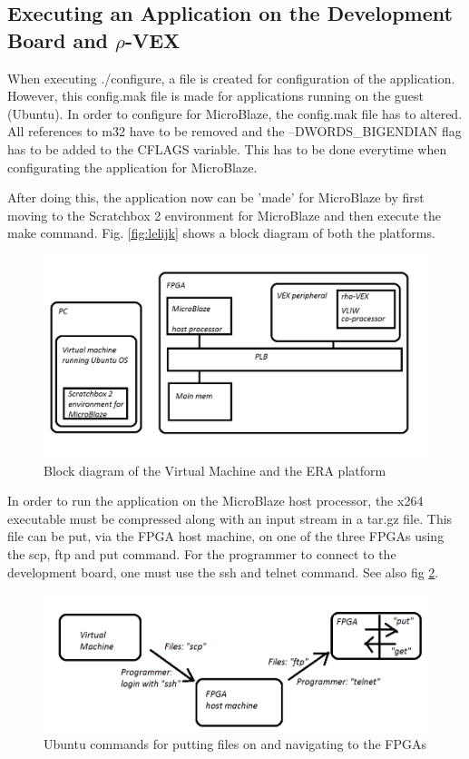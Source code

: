 \subsection{Executing an Application on the Development Board and $\rho$-VEX}

When executing ./configure, a file is created for configuration of the application. However, this config.mak file is made for applications running on the guest (Ubuntu). In order to configure for MicroBlaze, the config.mak file has to altered. All references to m32 have to be removed and the --DWORDS\_BIGENDIAN flag has to be added to the CFLAGS variable. This has to be done everytime when configurating the application for MicroBlaze.

After doing this, the application now can be 'made' for MicroBlaze by first moving to the Scratchbox 2 environment for MicroBlaze and then execute the make command. Fig. \ref{fig:lelijk} shows a block diagram of both the platforms.

\begin{figure}[htb]%
\includegraphics[width=\columnwidth]{Pictures/Platform_paint}%
\caption{Block diagram of the Virtual Machine and the ERA platform}%
\label{lelijk}%
\end{figure}

In order to run the application on the MicroBlaze host processor, the x264 executable must be compressed along with an input stream in a tar.gz file. This file can be put, via the FPGA host machine, on one of the three FPGAs using the scp, ftp and put command. For the programmer to connect to the development board, one must use the ssh and telnet command. See also fig \ref{fig:hoppen}.

\begin{figure}[htb]%
\includegraphics[width=\columnwidth]{Pictures/hop}%
\caption{Ubuntu commands for putting files on and navigating to the FPGAs}%
\label{fig:hoppen}%
\end{figure}

